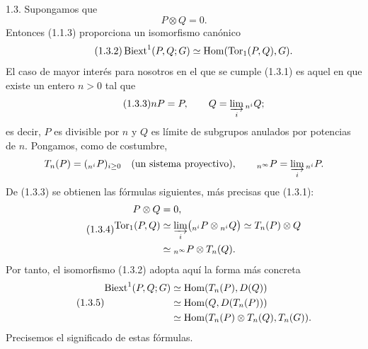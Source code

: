 1.3. Supongamos que
\begin{equation}\tag{1.3.1}
 P\otimes Q=0.
\end{equation}
Entonces (1.1.3) proporciona un isomorfismo canónico
\begin{equation}\tag{1.3.2}
 \operatorname{Biext}^1(P,Q;G)\simeq\operatorname{Hom}(\operatorname{Tor}_1(P,Q),G).
\end{equation}
El caso de mayor interés para nosotros en el que se cumple (1.3.1) es
aquel en que existe un entero $n>0$ tal que
\begin{equation}\tag{1.3.3}
 nP=P,\qquad
 Q=\varinjlim_i {}_{n^i}Q;
\end{equation}
es decir, $P$ es divisible por $n$ y $Q$ es límite de subgrupos
anulados por potencias de $n$. Pongamos, como de costumbre,
\[
 T_n(P)=({}_{n^i}P)_{i\geq0}\quad\text{(un sistema proyectivo)},\qquad
 {}_{n^\infty}P=\varinjlim_i{}_{n^i}P.
\]
De (1.3.3) se obtienen las fórmulas siguientes, más precisas que
(1.3.1):
\begin{equation}\tag{1.3.4}
\begin{split}
 P\otimes Q&=0,\\
 \operatorname{Tor}_1(P,Q)
 &\simeq\varinjlim_i
   \bigl({}_{n^i}P\otimes{}_{n^i}Q\bigr)
 \simeq T_n(P)\otimes Q\\
 &\simeq{}_{n^\infty}P\otimes T_n(Q).
\end{split}
\end{equation}
Por tanto, el isomorfismo (1.3.2) adopta aquí la forma más concreta
\begin{equation}\tag{1.3.5}
\begin{split}
 \operatorname{Biext}^1(P,Q;G)
 &\simeq\operatorname{Hom}(T_n(P),D(Q))\\
 &\simeq\operatorname{Hom}(Q,D(T_n(P)))\\
 &\simeq\operatorname{Hom}(T_n(P)\otimes T_n(Q),T_n(G)).
\end{split}
\end{equation}
Precisemos el significado de estas fórmulas.

